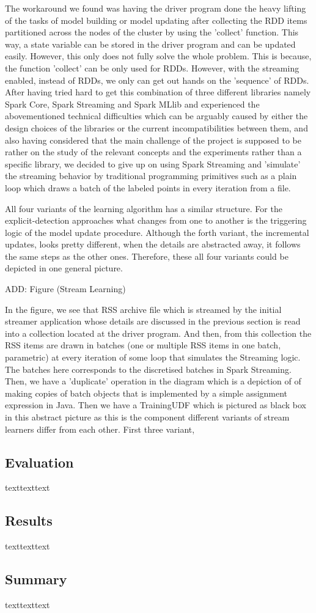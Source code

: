 \documentclass[12pt]{article}
\begin{document}
The workaround we found was having the driver program done the heavy lifting of the tasks of model building or model updating after collecting the RDD items partitioned across the nodes of the cluster by using the 'collect' function. This way, a state variable can be stored in the driver program and can be updated easily. However, this only does not fully solve the whole problem. This is because, the function 'collect' can be only used for RDDs. However, with the streaming enabled, instead of RDDs, we only can get out hands on the 'sequence' of RDDs. After having tried hard to get this combination of three different libraries namely Spark Core, Spark Streaming and Spark MLlib and experienced the abovementioned technical difficulties which can be arguably caused by either the design choices of the libraries or the current incompatibilities between them, and also having considered that the main challenge of the project is supposed to be rather on the study of the relevant concepts and the experiments rather than a specific library, we decided to give up on using Spark Streaming and 'simulate' the streaming behavior by traditional programming primitives such as a plain loop which draws a batch of the labeled points in every iteration from a file.

All four variants of the learning algorithm has a similar structure. For the explicit-detection approaches what changes from one to another is the triggering logic of the model update procedure. Although the forth variant, the incremental updates, looks pretty different, when the details are abstracted away, it follows the same steps as the other ones. Therefore, these all four variants could be depicted in one general picture.

ADD: Figure (Stream Learning)

In the figure, we see that RSS archive file which is streamed by the initial streamer application whose details are discussed in the previous section is read into a collection located at the driver program. And then, from this collection the RSS items are drawn in batches (one or multiple RSS items in one batch, parametric) at every iteration of some loop that simulates the Streaming logic. The batches here corresponds to the discretised batches in Spark Streaming. Then, we have a 'duplicate' operation in the diagram which is a depiction of of making copies of batch objects that is implemented by a simple assignment expression in Java. Then we have a TrainingUDF which is pictured as black box in this abstract picture as this is the component different variants of stream learners differ from each other. First three variant, 



\subsection{Evaluation}
texttexttext

\subsection{Results}
texttexttext

\subsection{Summary}
texttexttext

\newpage
\medskip

\end{document}
